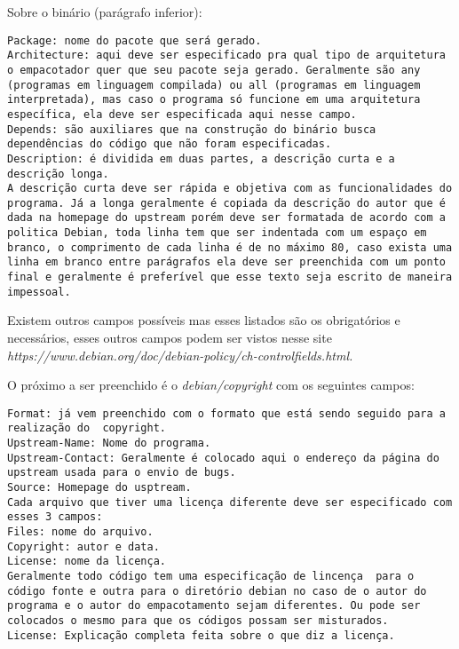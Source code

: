 Sobre o binário (parágrafo inferior):
\begin{verbatim}
Package: nome do pacote que será gerado.
Architecture: aqui deve ser especificado pra qual tipo de arquitetura o empacotador quer que seu pacote seja gerado. Geralmente são any (programas em linguagem compilada) ou all (programas em linguagem interpretada), mas caso o programa só funcione em uma arquitetura específica, ela deve ser especificada aqui nesse campo.
Depends: são auxiliares que na construção do binário busca dependências do código que não foram especificadas. 
Description: é dividida em duas partes, a descrição curta e a descrição longa.
A descrição curta deve ser rápida e objetiva com as funcionalidades do programa. Já a longa geralmente é copiada da descrição do autor que é dada na homepage do upstream porém deve ser formatada de acordo com a politica Debian, toda linha tem que ser indentada com um espaço em branco, o comprimento de cada linha é de no máximo 80, caso exista uma linha em branco entre parágrafos ela deve ser preenchida com um ponto final e geralmente é preferível que esse texto seja escrito de maneira impessoal.
\end{verbatim}

Existem outros campos possíveis mas esses listados são os obrigatórios e necessários, esses outros campos podem ser vistos nesse site \textit{https://www.debian.org/doc/debian-policy/ch-controlfields.html. }

O próximo a ser preenchido é o \textit{debian/copyright} com os seguintes campos:
\begin{verbatim}
Format: já vem preenchido com o formato que está sendo seguido para a realização do  copyright.
Upstream-Name: Nome do programa.
Upstream-Contact: Geralmente é colocado aqui o endereço da página do upstream usada para o envio de bugs.
Source: Homepage do usptream.
Cada arquivo que tiver uma licença diferente deve ser especificado com esses 3 campos:
Files: nome do arquivo.
Copyright: autor e data.
License: nome da licença.
Geralmente todo código tem uma especificação de lincença  para o código fonte e outra para o diretório debian no caso de o autor do programa e o autor do empacotamento sejam diferentes. Ou pode ser colocados o mesmo para que os códigos possam ser misturados.
License: Explicação completa feita sobre o que diz a licença. 
\end{verbatim}

